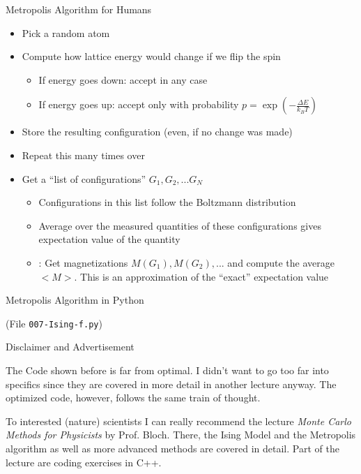 
\begin{frame}{Metropolis Algorithm for Humans}
%
\begin{itemize}
\item Pick a random atom
\item Compute how lattice energy would change if we flip the spin
	\begin{itemize}
	\item If energy goes down: accept in any case
	\item If energy goes up: accept only with probability $p = \exp(-\frac{\Delta E}{k_B T})$
	\end{itemize}
\item Store the resulting configuration (even, if no change was made)
\item Repeat this many times over
\item[\Thus] Get a \enquote{list of configurations} $G_1, G_2, ... G_N$
	\begin{itemize}
	\item Configurations in this list follow the Boltzmann distribution
	\item Average over the measured quantities of these configurations gives expectation value of the quantity
	\item \eg: Get magnetizations $M(G_1), M(G_2), ...$ and compute the average $<M>$. This is an approximation of the \enquote{exact} expectation value
	\end{itemize}
\end{itemize}
%
\end{frame}


\begin{frame}{Metropolis Algorithm in Python}
%
\begin{center}
(File \texttt{007-Ising-f.py})
\end{center}
%
\end{frame}


\begin{frame}{Disclaimer and Advertisement}
%
\begin{hintbox}
The Code shown before is far from optimal. I didn't want to go too far into specifics since they are covered in more detail in another lecture anyway. The optimized code, however, follows the same train of thought.

To interested (nature) scientists I can really recommend the lecture \emph{Monte Carlo Methods for Physicists} by Prof. Bloch. There, the Ising Model and the Metropolis algorithm as well as more advanced methods are covered in detail. Part of the lecture are coding exercises in C++.
\end{hintbox}
%
\end{frame}
